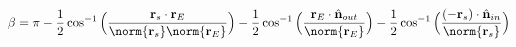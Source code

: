\documentclass[crop=false,class=book,oneside]{standalone}
\begin{document}
        \begin{theorem}
            \begin{equation*}
                \beta=\pi-\frac{1}{2}\cos^{-1}
                \Big(\frac{\mathbf{r}_{s}
                     \cdot\mathbf{r}_{E}}
                     {\norm{\mathbf{r}_{s}}
                     \norm{\mathbf{r}_{E}}}\Big)
                -\frac{1}{2}\cos^{-1}
                \Big(\frac{\mathbf{r}_{E}\cdot
                           \hat{\mathbf{n}}_{out}}
                          {\norm{\mathbf{r}_{E}}}\Big)
                -\frac{1}{2}\cos^{-1}
                \Big(\frac{(-\mathbf{r}_{s})\cdot
                           \hat{\mathbf{n}}_{in}}
                          {\norm{\mathbf{r}_{s}}}\Big)
            \end{equation*}
        \end{theorem}
\end{document}
